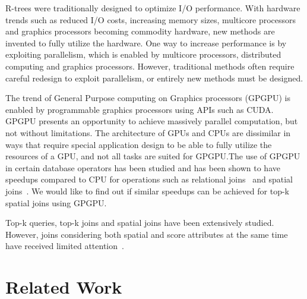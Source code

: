 R-trees were traditionally designed to optimize I/O performance. With hardware trends such as reduced I/O costs, increasing memory sizes, multicore processors and graphics processors becoming commodity hardware, new methods are invented to fully utilize the hardware. One way to increase performance is by exploiting parallelism, which is enabled by multicore processors, distributed computing and graphics processors. However, traditional methods often require careful redesign to exploit parallelism, or entirely new methods must be designed.

The trend of General Purpose computing on Graphics processors (GPGPU) is enabled by programmable graphics processors using APIs such as CUDA\@. GPGPU presents an opportunity to achieve massively parallel computation, but not without limitations. The architecture of GPUs and CPUs are dissimilar in ways that require special application design to be able to fully utilize the resources of a GPU, and not all tasks are suited for GPGPU.\@ The use of GPGPU in certain database operators has been studied and has been shown to have speedups compared to CPU for operations such as relational joins~\cite{he2008relational} and spatial joins~\cite{yampaka2012spatial}. We would like to find out if similar speedups can be achieved for top-k spatial joins using GPGPU.\@

Top-k queries, top-k joins and spatial joins have been extensively studied. However, joins considering both spatial and score attributes at the same time have received limited attention~\cite{qi2013efficient}. 

\section{Related Work}

